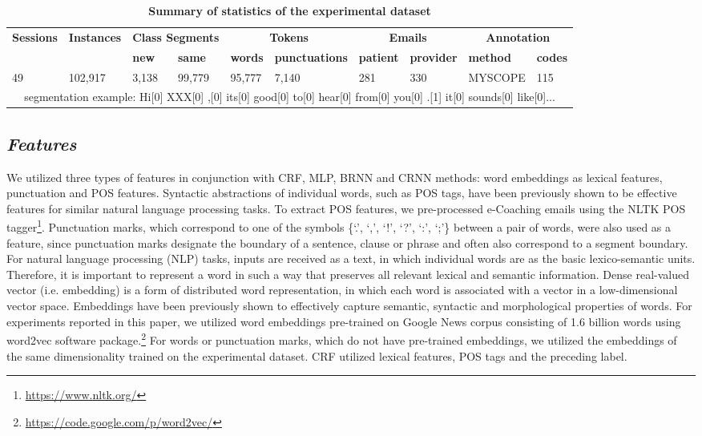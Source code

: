\documentclass{amia}
\begin{document}
\begin{table}[ht]
\centering
\caption{\textbf{Summary of statistics of the experimental dataset}}
\label{tab:datastat}
 \begin{tabular}{|l|l|l|l|l|l|l|l|l|l|}
  \hline
   \multirow{2}{*}{\textbf{Sessions}} & \multirow{2}{*}{\textbf{Instances}} & \multicolumn{2}{|c|}{\textbf{Class Segments}} & \multicolumn{2}{|c|}{\textbf{Tokens}} & \multicolumn{2}{|c|}{\textbf{Emails}} & \multicolumn{2}{|c|}{\textbf{Annotation}} \\\cline{3-10}
   &  & \textbf{new}  & \textbf{same} & \textbf{words} & \textbf{punctuations}  & \textbf{patient} & \textbf{provider} & \textbf{method}  & \textbf{codes} \\ \hline    
 49 & 102,917 & 3,138 & 99,779 & 95,777 & 7,140 & 281 & 330 & MYSCOPE & 115 \\ \hline
 \multicolumn{10}{|c|}{segmentation example: Hi[0] XXX[0] ,[0] its[0] good[0] to[0] hear[0] from[0] you[0] .[1] it[0] sounds[0] like[0]...} \\ \hline
  \end{tabular}
\end{table}     

\subsection*{\textit{Features}}
We utilized three types of features in conjunction with CRF, MLP, BRNN and CRNN methods: word embeddings as lexical features, punctuation and POS features. Syntactic abstractions of individual words, such as POS tags, have been previously shown to be effective features for similar natural language processing tasks.\cite{liu2005using,treviso2017sentence} To extract POS features, we pre-processed e-Coaching emails using the NLTK POS tagger\footnote{\url{https://www.nltk.org/}}. Punctuation marks, which correspond to one of the symbols \{`.', `,', `!', `?', `:', `;'\} between a pair of words, were also used as a feature, since punctuation marks designate the boundary of a sentence, clause or phrase and often also correspond to a segment boundary.\cite{cho2002text} For natural language processing (NLP) tasks, inputs are received as a text, in which individual words are as the basic lexico-semantic units. Therefore, it is important to represent a word in such a way that preserves all relevant lexical and semantic information. Dense real-valued vector (i.e. embedding) is a form of distributed word representation, in which each word is associated with a vector in a low-dimensional vector space. Embeddings have been previously shown to effectively capture semantic, syntactic and morphological properties of words.\cite{pennington2014glove, mikolov2013distributed} For experiments reported in this paper, we utilized word embeddings pre-trained on Google News corpus consisting of 1.6 billion words using word2vec software package.\footnote{\label{fn:word2vec}\url{https://code.google.com/p/word2vec/}} For words or punctuation marks, which do not have pre-trained embeddings, we utilized the embeddings of the same dimensionality trained on the experimental dataset. CRF utilized lexical features, POS tags and the preceding label. 
\end{document}
